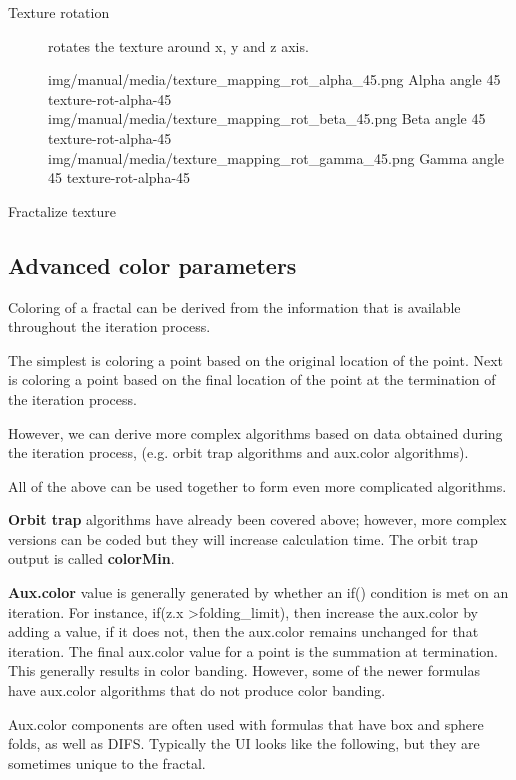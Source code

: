 \begin{description}
	 \item[Texture rotation] rotates the texture around x, y and z axis.
	 
	 \threeImagesWithTwoCaptionsFullWidth
	 {img/manual/media/texture_mapping_rot_alpha_45.png}
	 {Alpha angle 45\textdegree}
	 {texture-rot-alpha-45}
	 {img/manual/media/texture_mapping_rot_beta_45.png}
	 {Beta angle 45\textdegree}
	 {texture-rot-alpha-45}
	 {img/manual/media/texture_mapping_rot_gamma_45.png}
	 {Gamma angle 45\textdegree}
	 {texture-rot-alpha-45}
	 
	 \item[Fractalize texture]
	
 \end{description}




\subsection{Advanced color parameters}\label{materials-advanced-color-parameters}

Coloring of a fractal can be derived from the information that is available throughout the iteration process.

The simplest is coloring a point based on the original location of the point.
Next is coloring a point based on the final location of the point at the termination of the iteration process.

However, we can derive more complex algorithms based on data obtained during the iteration process, (e.g. orbit trap algorithms and aux.color algorithms).

All of the above can be used together to form even more complicated algorithms.

\textbf{Orbit trap} algorithms have already been covered above; however, more complex versions can be coded but they will increase calculation time. The orbit trap output is called \textbf{colorMin}.

\textbf{Aux.color} value is generally generated by whether an if() condition is met on an iteration. For instance, if(z.x \textgreater\space folding\_limit), then increase the aux.color by adding a value, if it does not, then the aux.color remains unchanged for that iteration. The final aux.color value for a point is the summation at termination. This generally results in color banding. However, some of the newer formulas have aux.color algorithms that do not produce color banding.

Aux.color components are often used with formulas that have box and sphere folds, as well as DIFS. Typically the UI looks like the following, but they are sometimes unique to the fractal.

